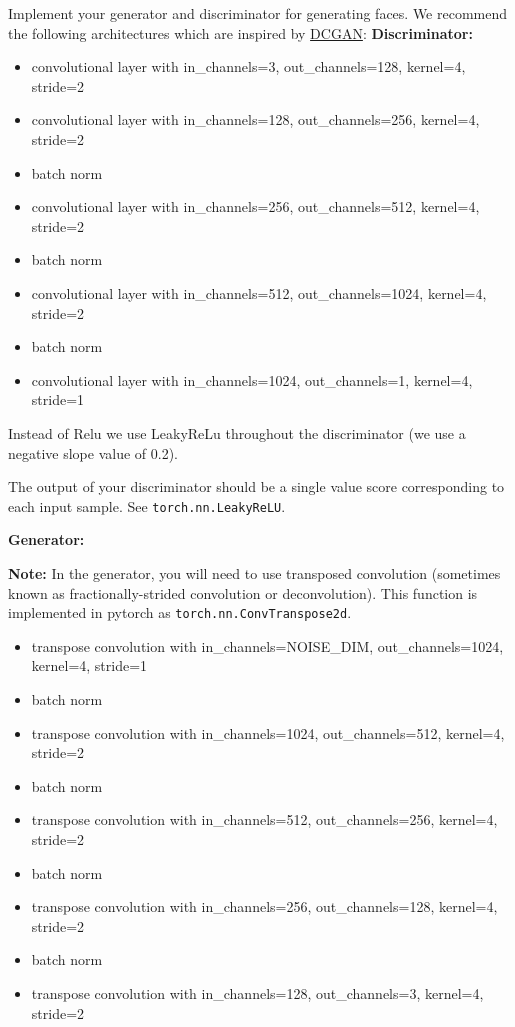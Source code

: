 \documentclass[11pt]{article}
\providecommand{\tightlist}{%
      \setlength{\itemsep}{0pt}\setlength{\parskip}{0pt}}
\begin{document}
Implement your generator and discriminator for generating faces. We
recommend the following architectures which are inspired by
\href{https://arxiv.org/pdf/1511.06434.pdf}{DCGAN}:
\textbf{Discriminator:}

\begin{itemize}
\tightlist
\item
  convolutional layer with in\_channels=3, out\_channels=128, kernel=4,
  stride=2
\item
  convolutional layer with in\_channels=128, out\_channels=256,
  kernel=4, stride=2
\item
  batch norm
\item
  convolutional layer with in\_channels=256, out\_channels=512,
  kernel=4, stride=2
\item
  batch norm
\item
  convolutional layer with in\_channels=512, out\_channels=1024,
  kernel=4, stride=2
\item
  batch norm
\item
  convolutional layer with in\_channels=1024, out\_channels=1, kernel=4,
  stride=1
\end{itemize}

Instead of Relu we use LeakyReLu throughout the discriminator (we use a
negative slope value of 0.2).

The output of your discriminator should be a single value score
corresponding to each input sample. See \texttt{torch.nn.LeakyReLU}.

\textbf{Generator:}

\textbf{Note:} In the generator, you will need to use transposed
convolution (sometimes known as fractionally-strided convolution or
deconvolution). This function is implemented in pytorch as
\texttt{torch.nn.ConvTranspose2d}.

\begin{itemize}
\tightlist
\item
  transpose convolution with in\_channels=NOISE\_DIM,
  out\_channels=1024, kernel=4, stride=1
\item
  batch norm
\item
  transpose convolution with in\_channels=1024, out\_channels=512,
  kernel=4, stride=2
\item
  batch norm
\item
  transpose convolution with in\_channels=512, out\_channels=256,
  kernel=4, stride=2
\item
  batch norm
\item
  transpose convolution with in\_channels=256, out\_channels=128,
  kernel=4, stride=2
\item
  batch norm
\item
  transpose convolution with in\_channels=128, out\_channels=3,
  kernel=4, stride=2
\end{itemize}
\end{document}

